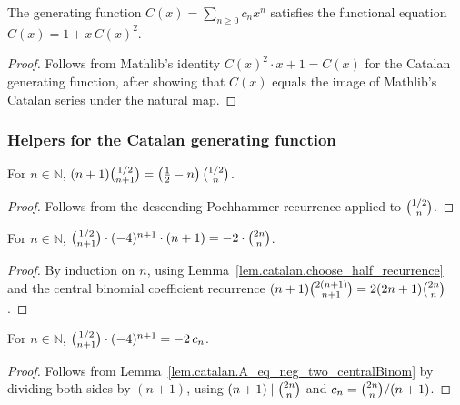 \begin{theorem}
\label{thm.catalan.gf_equation}
\leanhelper
\leanok
The generating function $C(x) = \sum_{n\geq 0} c_n x^n$ satisfies the functional equation
$C(x) = 1 + x\, C(x)^2$.
\end{theorem}

\begin{proof}
\leanok
Follows from Mathlib's identity $C(x)^2 \cdot x + 1 = C(x)$ for the Catalan generating function,
after showing that $C(x)$ equals the image of Mathlib's Catalan series under the natural map.
\end{proof}

\subsubsection{Helpers for the Catalan generating function}

\begin{lemma}
\label{lem.catalan.choose_half_recurrence}
\leanhelper
\leanok
For $n\in\mathbb{N}$,
$(n+1)\dbinom{1/2}{n+1} = \left(\frac{1}{2}-n\right)\dbinom{1/2}{n}$.
\end{lemma}

\begin{proof}
\leanok
Follows from the descending Pochhammer recurrence
applied to $\dbinom{1/2}{n}$.
\end{proof}

\begin{lemma}
\label{lem.catalan.A_eq_neg_two_centralBinom}
\leanhelper
\leanok
For $n\in\mathbb{N}$,
$\dbinom{1/2}{n+1}\cdot(-4)^{n+1}\cdot(n+1) = -2\cdot\dbinom{2n}{n}$.
\end{lemma}

\begin{proof}
\leanok
By induction on $n$, using Lemma~\ref{lem.catalan.choose_half_recurrence}
and the central binomial coefficient recurrence $(n+1)\dbinom{2(n+1)}{n+1} = 2(2n+1)\dbinom{2n}{n}$.
\end{proof}

\begin{lemma}
\label{lem.catalan.choose_half_neg4_pow}
\leanhelper
\leanok
For $n\in\mathbb{N}$,
$\dbinom{1/2}{n+1}\cdot(-4)^{n+1} = -2\, c_n$.
\end{lemma}

\begin{proof}
\leanok
Follows from Lemma~\ref{lem.catalan.A_eq_neg_two_centralBinom} by dividing both sides by $(n+1)$,
using $(n+1)\mid\dbinom{2n}{n}$ and $c_n = \dbinom{2n}{n}/(n+1)$.
\end{proof}

